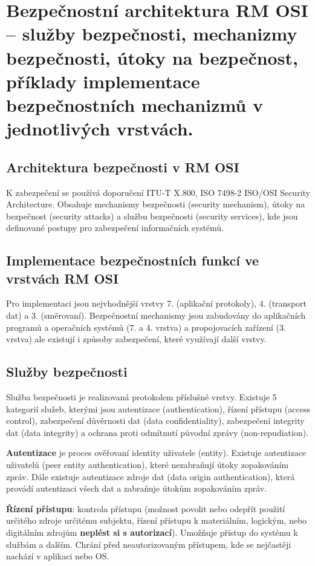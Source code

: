 \clearpage
\section{Bezpečnostní architektura RM OSI -- služby bezpečnosti, mechanizmy bezpečnosti, útoky na bezpečnost, příklady implementace bezpečnostních mechanizmů v jednotlivých vrstvách.}

\subsection{Architektura bezpečnosti v RM OSI}

K zabezpečení se používá doporučení ITU-T X.800, ISO 7498-2 ISO/OSI Security Architecture. Obsahuje mechanismy bezpečnosti (security mechanism), útoky na bezpečnost (security attacks) a službu bezpečnosti (security services), kde jsou definované postupy pro zabezpečení informačních systémů.

\subsection{Implementace bezpečnostních funkcí ve vrstvách RM OSI}

Pro implementaci jsou nejvhodnější vrstvy 7. (aplikační protokoly), 4. (transport dat) a 3. (směrovaní). Bezpečnostní mechanismy jsou zabudovány do aplikačních programů a operačních systémů (7. a 4. vrstva)  a propojovacích zařízení (3. vrstva) ale existují i způsoby zabezpečení, které využívají další vrstvy.

\subsection{Služby bezpečnosti}

Služba bezpečnosti je realizovaná protokolem příslušné vrstvy. Existuje 5 kategorií služeb, kterými jsou autentizace (authentication), řízení přístupu (access control), zabezpečení důvěrnosti dat (data confidentiality), zabezpečení integrity dat (data integrity) a ochrana proti odmítnutí původní zprávy (non-repudiation).

\textbf{Autentizace} je proces ověřovaní identity uživatele (entity). Existuje autentizace uživatelů (peer entity authentication), které nezabraňují útoky zopakováním zpráv. Dále existuje autentizace zdroje dat (data origin authentication), která provádí autentizaci všech dat a zabraňuje útokům zopakováním zpráv.

\textbf{Řízení přístupu}: kontrola přístupu (možnost povolit nebo odepřít použití určitého zdroje určitému subjektu, řízení přístupu k materiálním, logickým, nebo digitálním zdrojům \textbf{neplést si s autorizací}). Umožňuje přístup  do systému k službám a dalším. Chrání před neautorizovaným přístupem, kde se nejčastěji nachází v aplikaci nebo OS.

